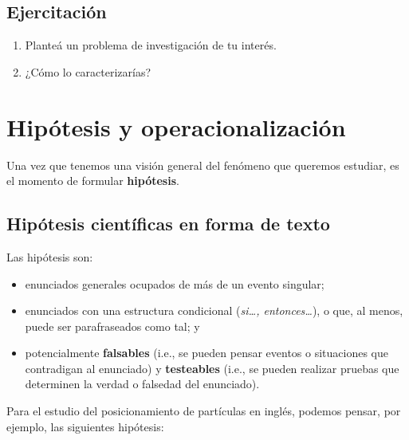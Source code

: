 \documentclass[authoryear,a4paper, 14pt]{scrartcl}
\begin{document}
\hypertarget{ejercitacion-3}{%
\subsection{Ejercitación}\label{ejercitacion-3}}

\begin{enumerate}
\def\labelenumi{\arabic{enumi}.}
\item
  Planteá un problema de investigación de tu interés.
\item
  ¿Cómo lo caracterizarías?
\end{enumerate}

\hypertarget{hipotesis-y-operacionalizacion}{%
\section{Hipótesis y
operacionalización}\label{hipotesis-y-operacionalizacion}}

Una vez que tenemos una visión general del fenómeno que queremos
estudiar, es el momento de formular \textbf{hipótesis}.

\hypertarget{hipotesis-cientificas-en-forma-de-texto}{%
\subsection{Hipótesis científicas en forma de
texto}\label{hipotesis-cientificas-en-forma-de-texto}}

Las hipótesis son:

\begin{itemize}
    \item
      enunciados generales ocupados de más de un evento singular;
    \item
      enunciados con una estructura condicional (\emph{si\ldots,
      entonces\ldots{}}), o que, al menos, puede ser parafraseados como tal;
      y
    \item
      potencialmente \textbf{falsables} (i.e., se pueden pensar eventos o
      situaciones que contradigan al enunciado) y \textbf{testeables} (i.e.,
      se pueden realizar pruebas que determinen la verdad o falsedad del
      enunciado).
\end{itemize}

Para el estudio del posicionamiento de partículas en inglés, podemos
pensar, por ejemplo, las siguientes hipótesis:
\end{document}
